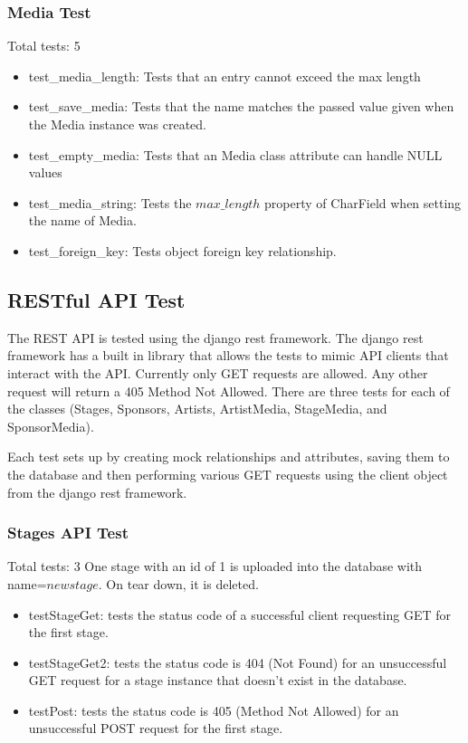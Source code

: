\documentclass[12pt,english]{scrartcl}
\begin{document}
\subsubsection{Media Test}

Total tests: 5

\begin{itemize}

\item test\_media\_length: Tests that an entry cannot exceed the max length

\item test\_save\_media: Tests that the name matches the passed value given when the Media instance was created.

\item test\_empty\_media: Tests that an Media class attribute can handle NULL values

\item test\_media\_string: Tests the $max\_length$ property of CharField when setting the name of Media.

\item test\_foreign\_key: Tests object foreign key relationship.
\end{itemize}

\subsection{RESTful API Test} 

The REST API is tested using the django rest framework. The django rest framework has a built in library that allows the tests to mimic API clients that interact with the API.
Currently only GET requests are allowed. Any other request will return a 405 Method Not Allowed. There are three tests for each of the 
classes (Stages, Sponsors, Artists, ArtistMedia, StageMedia, and SponsorMedia). 

Each test sets up by creating mock relationships and attributes,
saving them to the database and then performing various GET requests using the client object from the django rest framework.

\subsubsection{Stages API Test} 
Total tests: 3
One stage with an id of 1 is uploaded into the database with name=$new stage$. On tear down, it is deleted.
\begin{itemize}
 \item testStageGet: tests the status code of a successful client requesting GET for the first stage.
 
 \item testStageGet2: tests the status code is 404 (Not Found) for an unsuccessful GET request for a stage instance
 that doesn't exist in the database.
 
 \item testPost: tests the status code is 405 (Method Not Allowed) for an unsuccessful POST request for the first stage.
\end{itemize}
\end{document}
